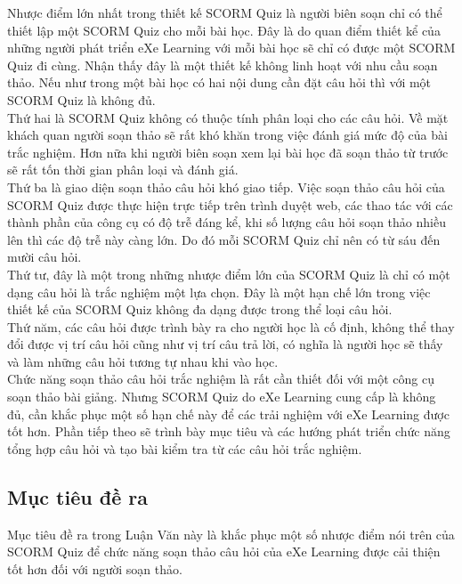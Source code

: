 	Nhược điểm lớn nhất trong thiết kế SCORM Quiz là người biên soạn chỉ có thể thiết lập một SCORM Quiz cho mỗi bài học. Đây là do quan điểm thiết kể của những người phát triển eXe Learning với mỗi bài học sẽ chỉ có được một SCORM Quiz đi cùng. Nhận thấy đây là một thiết kế không linh hoạt với nhu cầu soạn thảo. Nếu như trong một bài học có hai nội dung cần đặt câu hỏi thì với một SCORM Quiz là không đủ.\\
	
	Thứ hai là SCORM Quiz không có thuộc tính phân loại cho các câu hỏi. Về mặt khách quan người soạn thảo sẽ rất khó khăn trong việc đánh giá mức độ của bài trắc nghiệm. Hơn nữa khi người biên soạn xem lại bài học đã soạn thảo từ trước sẽ rất tốn thời gian phân loại và đánh giá.\\
	
	Thứ ba là giao diện soạn thảo câu hỏi khó giao tiếp. Việc soạn thảo câu hỏi của SCORM Quiz được thực hiện trực tiếp trên trình duyệt web, các thao tác với các thành phần của công cụ có độ trễ đáng kể, khi số lượng câu hỏi soạn thảo nhiều lên thì các độ trễ này càng lớn. Do đó mỗi SCORM Quiz chỉ nên có từ sáu đến mười câu hỏi.\\
	
	Thứ tư, đây là một trong những nhược điểm lớn của SCORM Quiz là chỉ có một dạng câu hỏi là trắc nghiệm một lựa chọn. Đây là một hạn chế lớn trong việc thiết kế của SCORM Quiz không đa dạng được trong thể loại câu hỏi.\\
	
	Thứ năm, các câu hỏi được trình bày ra cho người học là cố định, không thể thay đổi được vị trí câu hỏi cũng như vị trí câu trả lời, có nghĩa là người học sẽ thấy và làm những câu hỏi tương tự nhau khi vào học.\\
	
	Chức năng soạn thảo câu hỏi trắc nghiệm là rất cần thiết đối với một công cụ soạn thảo bài giảng. Nhưng SCORM Quiz do eXe Learning cung cấp là không đủ, cần khắc phục một số hạn chế này để các trải nghiệm với eXe Learning được tốt hơn. Phần tiếp theo sẽ trình bày mục tiêu và các hướng phát triển chức năng tổng hợp câu hỏi và tạo bài kiểm tra từ các câu hỏi trắc nghiệm.

\subsection{Mục tiêu đề ra}

	Mục tiêu đề ra trong Luận Văn này là khắc phục một số nhược điểm nói trên của SCORM Quiz để chức năng soạn thảo câu hỏi của eXe Learning được cải thiện tốt hơn đối với người soạn thảo.\\
	

